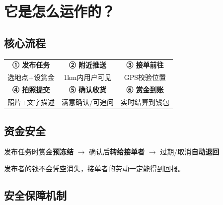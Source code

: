 \documentclass[12pt, a4paper]{article}
\begin{document}
\newpage

\section{它是怎么运作的？}

\subsection{核心流程}

\begin{mdframed}[style=flowstyle]
\begin{center}
\renewcommand{\arraystretch}{1.8}
\begin{tabular}{ccc}
\textbf{① 发布任务} & \textbf{② 附近推送} & \textbf{③ 接单前往} \\
{\small 选地点+设赏金} & {\small 1km内用户可见} & {\small GPS校验位置} \\[8pt]
\textbf{④ 拍照提交} & \textbf{⑤ 确认收货} & \textbf{⑥ 赏金到账} \\
{\small 照片+文字描述} & {\small 满意确认/可追问} & {\small 实时结算到钱包} \\
\end{tabular}
\end{center}
\end{mdframed}

\subsection{资金安全}

\begin{mdframed}[style=flowstyle]
\begin{center}
发布任务时赏金\textbf{预冻结} $\longrightarrow$ 确认后\textbf{转给接单者} $\longrightarrow$ 过期/取消\textbf{自动退回}
\end{center}
\vspace{4pt}
{\small 发布者的钱不会凭空消失，接单者的劳动一定能得到回报。}
\end{mdframed}

\subsection{安全保障机制}
\end{document}
